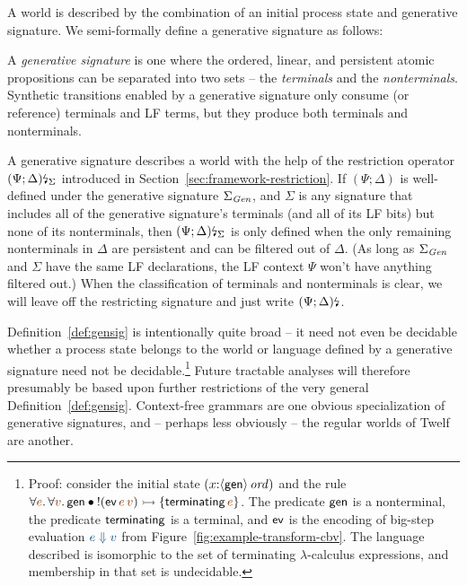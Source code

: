 A world is described by the combination of an initial process state
and generative signature. We semi-formally define a generative
signature as follows:

\bigskip
\begin{definition}\label{def:gensig}
  A {\em generative signature} is one where the ordered, linear, and
  persistent atomic propositions can be separated into two sets -- the
  {\em terminals} and the {\em nonterminals}. Synthetic transitions
  enabled by a generative signature only consume (or reference) 
  terminals and LF terms, but they produce both terminals 
  and nonterminals.
\end{definition}
\bigskip

\noindent
A generative signature describes a world with the help of the
restriction operator ${(\Psi; \Delta)}{\mbox{\lightning}}_{\Sigma}$ introduced
in Section~\ref{sec:framework-restriction}. If $(\Psi; \Delta)$ is
well-defined under the generative signature $\Sigma_{\it Gen}$, and
$\Sigma$ is any signature that includes all of the generative
signature's terminals (and all of its LF bits) but none of its
nonterminals, then ${(\Psi; \Delta)}{\mbox{\lightning}}_{\Sigma}$ is only
defined when the only remaining nonterminals in $\Delta$ are
persistent and can be filtered out of $\Delta$. (As long as
$\Sigma_{\it Gen}$ and $\Sigma$ have the same LF declarations, the LF
context $\Psi$ won't have anything filtered out.) When the
classification of terminals and nonterminals is clear, we will leave
off the restricting signature and just write ${(\Psi;
  \Delta)}{\mbox{\lightning}}_{}$.

Definition~\ref{def:gensig} is intentionally quite broad -- it need
not even be decidable whether a process state belongs to the world or
language defined by a generative signature need not be
decidable.\footnote{Proof: consider the initial state
  $(x{:}{\langle {\sf gen} \rangle}\,{{\it ord}})$ and the rule $\forall
  \lf{e}.\,\forall\lf{v}.\,{\sf gen} \fuse {!}({\sf
    ev}\,\lf{e}\,\lf{v}) \lefti \{ {\sf terminating}\,\lf{e} \}$. The
  predicate ${\sf gen}$ is a nonterminal, the predicate ${\sf
    terminating}$ is a terminal, and ${\sf ev}$ is the encoding of
  big-step evaluation $\obj{e \Downarrow v}$ from
  Figure~\ref{fig:example-transform-cbv}.  The language described is
  isomorphic to the set of terminating $\lambda$-calculus expressions,
  and membership in that set is undecidable.} Future tractable
analyses will therefore presumably be based upon further restrictions
of the very general Definition~\ref{def:gensig}.
Context-free grammars are one obvious specialization of generative
signatures, and -- perhaps less obviously -- the regular worlds
of Twelf \cite{schurmann00automating} are another. 


